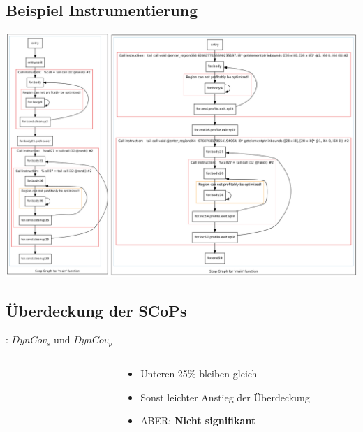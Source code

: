 \documentclass[aspectratio=169, xcolor=dvipsnames]{beamer}
\begin{document}
\subsection{Beispiel Instrumentierung}
\begin{frame}{\subsecname}
    \centering
    \includegraphics[height=\textheight]{gfx/matmulScopsAfterInstrumentation.png}
\end{frame}
\subsection{Überdeckung der SCoPs}
\begin{frame}{\subsecname: \(DynCov_s\) und \(DynCov_p\)}
    \vspace{-1cm}
    \begin{columns}
        \begin{column}{5cm}
            \begin{figure}[!h]
                
            \end{figure}
        \end{column}
        \begin{column}{5cm}
            \begin{itemize}[<+(1)->]
                \item Unteren 25\% bleiben gleich
                \item Sonst leichter Anstieg der Überdeckung
                \item ABER: \textbf{Nicht signifikant}
            \end{itemize}
        \end{column}
    \end{columns}
\end{frame}
\end{document}
